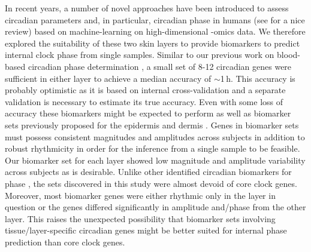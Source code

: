
In recent years, a number of novel approaches have been introduced to assess circadian parameters and, in particular, circadian phase in humans (see \cite{Dijk2020} for a nice review) based on machine-learning on high-dimensional -omics data. We therefore explored the suitability of these two skin layers to provide biomarkers to predict internal clock phase from single samples. Similar to our previous work on blood-based circadian phase determination \cite{Wittenbrink2018}, a small set of 8-12 circadian genes were sufficient in either layer to achieve a median accuracy of $\sim$1\,h. This accuracy is probably optimistic as it is based on internal cross-validation and a separate validation is necessary to estimate its true accuracy. Even with some loss of accuracy these biomarkers might be expected to perform as well as biomarker sets previously proposed for the epidermis and dermis \cite{Wu2018, Wu2020}. Genes in biomarker sets must possess consistent magnitudes and amplitudes across subjects in addition to robust rhythmicity in order for the inference from a single sample to be feasible. Our biomarker set for each layer showed low magnitude and amplitude variability across subjects as is desirable. Unlike other identified circadian biomarkers for phase \cite{Wu2018, Wu2020,Laing2017,Wittenbrink2018}, the sets discovered in this study were almost devoid of core clock genes. Moreover, most biomarker genes were either rhythmic only in the layer in question or the genes differed significantly in amplitude and/phase from the other layer. This raises the unexpected possibility that biomarker sets involving tissue/layer-specific circadian genes might be better suited for internal phase prediction than core clock genes.

